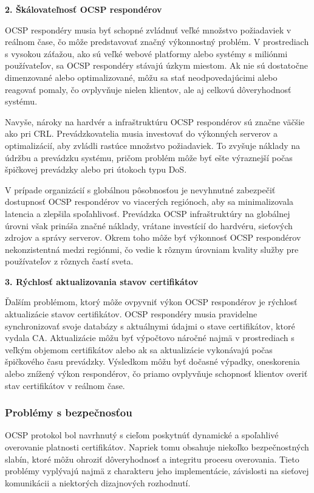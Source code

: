 \documentclass[12pt, twoside]{book}
\newcommand{\subsubsubsection}[1]{%
  \vspace{0.2em}  
  \textbf{#1} \\[0.2em]
  \hspace*{\parindent}
}
\begin{document}
\subsubsubsection{2. Škálovateľnosť OCSP respondérov}
OCSP respondéry musia byť schopné zvládnuť veľké množstvo požiadaviek v reálnom čase, čo môže predstavovať značný výkonnostný problém. V prostrediach s vysokou záťažou, ako sú veľké webové platformy alebo systémy s miliónmi používateľov, sa OCSP respondéry stávajú úzkym miestom. Ak nie sú dostatočne dimenzované alebo optimalizované, môžu sa stať neodpovedajúcimi alebo reagovať pomaly, čo ovplyvňuje nielen klientov, ale aj celkovú dôveryhodnosť systému.

Navyše, nároky na hardvér a infraštruktúru OCSP respondérov sú značne väčšie ako pri CRL. Prevádzkovatelia musia investovať do výkonných serverov a optimalizácií, aby zvládli rastúce množstvo požiadaviek. To zvyšuje náklady na údržbu a prevádzku systému, pričom problém môže byť ešte výraznejší počas špičkovej prevádzky alebo pri útokoch typu DoS.

V prípade organizácií s globálnou pôsobnosťou je nevyhnutné zabezpečiť dostupnosť OCSP respondérov vo viacerých regiónoch, aby sa minimalizovala latencia a zlepšila spoľahlivosť. Prevádzka OCSP infraštruktúry na globálnej úrovni však prináša značné náklady, vrátane investícií do hardvéru, sieťových zdrojov a správy serverov. Okrem toho môže byť výkonnosť OCSP respondérov nekonzistentná medzi regiónmi, čo vedie k rôznym úrovniam kvality služby pre používateľov z rôznych častí sveta.

\subsubsubsection{3. Rýchlosť aktualizovania stavov certifikátov}
Ďalším problémom, ktorý môže ovpyvniť výkon OCSP respondérov je rýchlosť aktualizácie stavov certifikátov. OCSP respondéry musia pravidelne synchronizovať svoje databázy s aktuálnymi údajmi o stave certifikátov, ktoré vydala CA. Aktualizácie môžu byť výpočtovo náročné najmä v prostrediach s veľkým objemom certifikátov alebo ak sa aktualizácie vykonávajú počas špičkového času prevádzky. Výsledkom môžu byť dočasné výpadky, oneskorenia alebo znížený výkon respondérov, čo priamo ovplyvňuje schopnosť klientov overiť stav certifikátov v reálnom čase.


\subsubsection{Problémy s bezpečnosťou}
OCSP protokol bol navrhnutý s cieľom poskytnúť dynamické a spoľahlivé overovanie platnosti certifikátov. Napriek tomu obsahuje niekoľko bezpečnostných slabín, ktoré môžu ohroziť dôveryhodnosť a integritu procesu overovania. Tieto problémy vyplývajú najmä z charakteru jeho implementácie, závislosti na sieťovej komunikácii a niektorých dizajnových rozhodnutí.
\end{document}
